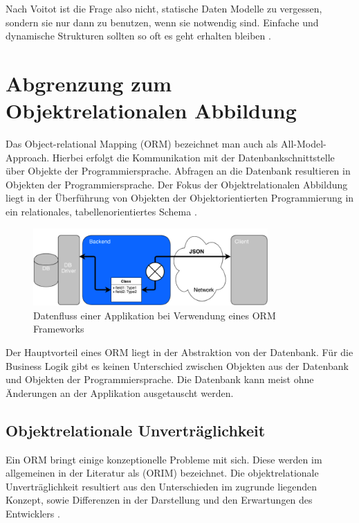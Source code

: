 Nach Voitot ist die Frage also nicht, statische Daten Modelle zu vergessen, sondern sie nur dann zu benutzen, wenn sie notwendig sind. Einfache und dynamische Strukturen sollten so oft es geht erhalten bleiben \cite{jctc}.

\section{Abgrenzung zum Objektrelationalen Abbildung}
Das Object-relational Mapping (ORM) bezeichnet man auch als All-Model-Approach. Hierbei erfolgt die Kommunikation mit der Datenbankschnittstelle über Objekte der Programmiersprache. Abfragen an die Datenbank resultieren in Objekten der Programmiersprache. Der Fokus der Objektrelationalen Abbildung liegt in der Überführung von Objekten der Objektorientierten Programmierung in ein relationales, tabellenorientiertes Schema \cite{wambler}. 

\begin{figure}[h]   
  \centering     
  \includegraphics[width=0.8\textwidth]{img/orm.png}  
   \caption{Datenfluss einer Applikation bei Verwendung eines ORM Frameworks}   
  \label{fig:orm} 
\end{figure}

Der Hauptvorteil eines ORM liegt in der Abstraktion von der Datenbank. Für die Business Logik gibt es keinen Unterschied zwischen Objekten aus der Datenbank und Objekten der Programmiersprache. Die Datenbank kann meist ohne Änderungen an der Applikation ausgetauscht werden.

\FloatBarrier
\subsection{Objektrelationale Unverträglichkeit}

Ein ORM bringt einige konzeptionelle Probleme mit sich. Diese werden im allgemeinen in der Literatur als  (ORIM) bezeichnet. Die objektrelationale Unverträglichkeit resultiert aus den Unterschieden im zugrunde liegenden Konzept, sowie Differenzen in der Darstellung und den Erwartungen des Entwicklers \cite{bowers}.

